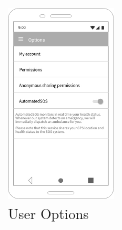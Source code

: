 \begin{figure}[h!]

 \centering

   \includegraphics[width=0.25\textwidth]{img/mockup/u_options.jpg}

    \caption{User Options}

\end{figure}


